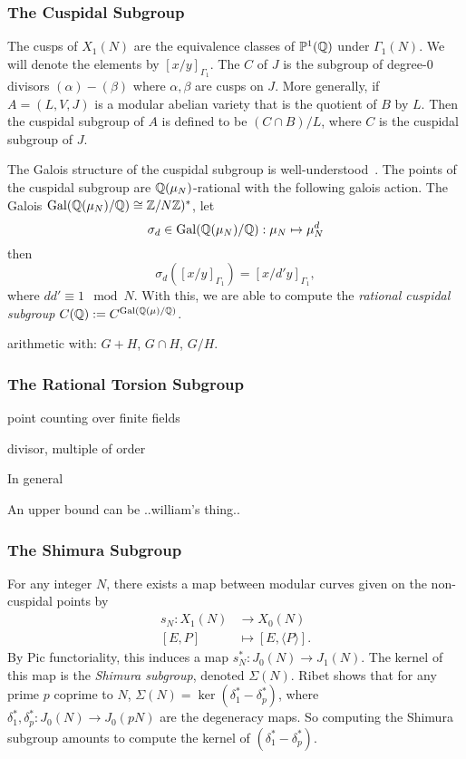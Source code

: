 \documentclass{article}
\begin{document}
\subsubsection{The Cuspidal Subgroup}

The cusps of $X_1(N)$ are the equivalence classes of $\mathbb{P}^1(\mathbb{Q})$ under
$\Gamma_1(N)$. We will denote the elements by $[x/y]_{\Gamma_1}$. The
 $C$ of $J$ is the subgroup of degree-0 divisors
$(\alpha)-(\beta)$ where $\alpha, \beta$ are cusps on $J$. More generally, if
$A=(L, V, J)$ is a modular abelian variety that is the quotient of $B$ by $L$.
Then the cuspidal subgroup of $A$ is defined to be $(C\cap B)/L$, where $C$ is
the cuspidal subgroup of $J$. 

The Galois structure of the cuspidal subgroup is well-understood~\cite[\S
1.3]{MR670070}. The points of the cuspidal subgroup are $\mathbb{Q}(\mu_N)$-rational
with the following galois action. The Galois $\operatorname{Gal}(\mathbb{Q}(\mu_N)/\mathbb{Q})\cong
\mathbb{Z}/N\mathbb{Z})^*$, let
\[
    \sigma_d\in \operatorname{Gal}(\mathbb{Q}(\mu_N)/\mathbb{Q}):\mu_N\mapsto \mu_N ^d
\]
then
\[
    \sigma_d([x/y]_{\Gamma_1})=[x/d'y]_{\Gamma_1},
\]
where $dd'\equiv 1 \mod{N}$. With this, we are able to compute the
\emph{rational cuspidal subgroup} $C(\mathbb{Q}):=C^{\operatorname{Gal}(\mathbb{Q}(\mu)/\mathbb{Q})}$.


arithmetic with: $G+H$, $G\cap H$, $G/H$.

\subsubsection{The Rational Torsion Subgroup}

point counting over finite fields

divisor, multiple of order


In general 

An upper bound can be
..william's thing..

\subsubsection{The Shimura Subgroup}

For any integer $N$, there exists a map between modular curves given
on the non-cuspidal points by
\begin{align*}
    s_N: X_1(N) & \to X_0(N) \\
    [E, P]      & \mapsto [E, \langle P \rangle].
\end{align*}
By Pic functoriality, this induces a map $s_N ^*: J_0(N)\to J_1(N)$. The
kernel of this map is the \emph{Shimura subgroup}, denoted $\Sigma(N)$. Ribet
shows that for any prime $p$ coprime to $N$, $\Sigma(N)=\ker(\delta_1
^*-\delta_p ^*)$, where $\delta_1^*, \delta_p ^*:J_0(N)\to J_0(pN)$ are the
degeneracy maps. So computing the Shimura subgroup amounts to compute the
kernel of $(\delta_1 ^* - \delta_p ^*)$.
\end{document}

